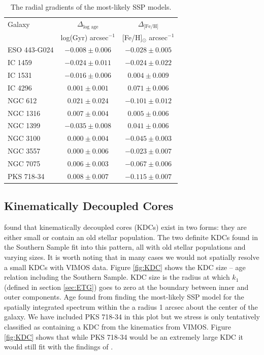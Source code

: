 			\begin{table}
				\centering
				\caption{The radial gradients of the most-likely SSP models.}
				\label{tab:popGrad}
				\begin{tabular}{l c c}
					\hline
					\hline 
					Galaxy 	& $\Delta_\text{log age}$ & $\Delta_\text{[Fe/H]}$ \\ 
						& log(Gyr) arcsec$^{-1}$ & [Fe/H]$_\odot$ arcsec$^{-1}$ \\
					\hline
					ESO 443-G024 & $-0.008 \pm 0.006$ & $-0.028 \pm 0.005$ \\
					IC 1459 	& $-0.024 \pm 0.011$ & $-0.024 \pm 0.022$ \\
					IC 1531 	& $-0.016 \pm 0.006$ & $0.004 \pm 0.009$ \\
					IC 4296		& $0.001 \pm 0.001$ & $0.071 \pm 0.006$ \\
					NGC 612 	& $0.021 \pm 0.024$ & $-0.101 \pm 0.012$ \\
					NGC 1316 	& $0.007 \pm 0.004$ & $0.005 \pm 0.006$ \\
					NGC 1399 	& $-0.035 \pm 0.008$ & $0.041 \pm 0.006$ \\
					NGC 3100 	& $0.000 \pm 0.004$ & $-0.045 \pm 0.003$ \\
					NGC 3557 	& $0.000 \pm 0.006$ & $-0.023 \pm 0.007$ \\
					NGC 7075 	& $0.006 \pm 0.003$ & $-0.067 \pm 0.006$ \\
					PKS 718-34  & $0.008 \pm 0.007$ & $-0.115 \pm 0.007$ \\
					\hline
					\hline
				\end{tabular}
			\end{table}



	\subsection{Kinematically Decoupled Cores}
		\label{subsec:popKDC}

		\citet{Kuntschner2010} found that kinematically decoupled cores (KDCs) exist in two forms: they are either small or contain an old stellar population. The two definite KDCs found in the Southern Sample fit into this pattern, all with old stellar populations and varying sizes. It is worth noting that in many cases we would not spatially resolve a small KDCs with VIMOS data. Figure \ref{fig:KDC} shows the KDC size -- age relation including the Southern Sample. KDC size is the radius at which $k_1$ (defined in section \ref{sec:ETG}) goes to zero at the boundary between inner and outer components. Age found from finding the most-likely SSP model for the spatially integrated spectrum within the a radius 1 arcsec about the center of the galaxy. We have included PKS 718-34 in this plot but we stress is only tentatively classified as containing a KDC from the kinematics from VIMOS. Figure \ref{fig:KDC} shows that while PKS 718-34 would be an extremely large KDC it would still fit with the findings of \citet{Kuntschner2010}.

